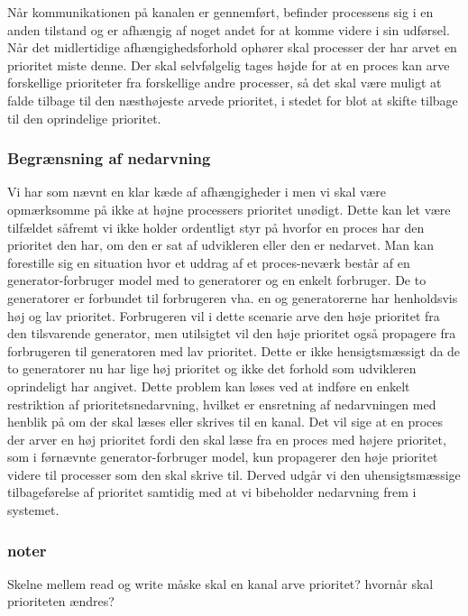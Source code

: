 Når kommunikationen på kanalen er gennemført, befinder processens sig i en anden tilstand og er afhængig af noget andet for at komme videre i sin udførsel. 
Når det midlertidige afhængighedsforhold ophører skal processer der har arvet en prioritet miste denne. Der skal selvfølgelig tages højde for at en proces kan arve forskellige prioriteter fra forskellige andre processer, så det skal være muligt at falde tilbage til den næsthøjeste arvede prioritet, i stedet for blot at skifte tilbage til den oprindelige prioritet. 

\subsubsection*{Begrænsning af nedarvning}
Vi har som nævnt en klar kæde af afhængigheder i \pycsp men vi skal være opmærksomme på ikke at højne processers prioritet unødigt. Dette kan let være tilfældet såfremt vi ikke holder ordentligt styr på hvorfor en proces har den prioritet den har, om den er sat af udvikleren eller den er nedarvet. Man kan forestille sig en situation hvor et uddrag af et proces-neværk består af en generator-forbruger model med to generatorer og en enkelt forbruger. De to generatorer er forbundet til forbrugeren vha. en  og generatorerne har henholdsvis høj og lav prioritet. Forbrugeren vil i dette scenarie arve den høje prioritet fra den tilsvarende generator, men utilsigtet vil den høje prioritet også propagere fra forbrugeren til generatoren med lav prioritet. Dette er ikke hensigtsmæssigt da de to generatorer nu har lige høj prioritet og ikke det forhold som udvikleren oprindeligt har angivet. Dette problem kan løses ved at indføre en enkelt restriktion af prioritetsnedarvning, hvilket er ensretning af nedarvningen med henblik på om der skal læses eller skrives til en kanal. Det vil sige at en proces der arver en høj prioritet fordi den skal læse fra en proces med højere prioritet, som i førnævnte generator-forbruger model, kun propagerer den høje prioritet videre til processer som den skal skrive til. Derved udgår vi den uhensigtsmæssige tilbageførelse af prioritet samtidig med at vi bibeholder nedarvning frem i systemet.

\subsubsection{noter}
Skelne mellem read og write
måske skal en kanal arve prioritet?
hvornår skal prioriteten ændres? 


